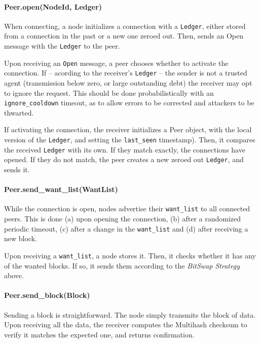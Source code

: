 \documentclass{sig-alternate}
\begin{document}
\paragraph{Peer.open(NodeId, Ledger)}

When connecting, a node initializes a connection with a
\texttt{Ledger}, either stored from a connection in the past or a new one
zeroed out. Then, sends an Open message with the \texttt{Ledger} to the peer.

Upon receiving an \texttt{Open} message, a peer chooses whether to activate
the connection. If -- acording to the receiver's \texttt{Ledger} -- the sender
is not a trusted agent (transmission below zero, or large outstanding debt) the
receiver may opt to ignore the request. This should be done probabilistically
with an \texttt{ignore\_cooldown} timeout, as to allow errors to be corrected
and attackers to be thwarted.

If activating the connection, the receiver initializes a Peer object, with the
local version of the \texttt{Ledger}, and setting the \texttt{last\_seen}
timestamp). Then, it compares the received
\texttt{Ledger} with its own. If they match exactly, the connections have
opened. If they do not match, the peer creates a new zeroed out
\texttt{Ledger}, and sends it.


\paragraph{Peer.send\_want\_list(WantList)}

While the connection is open, nodes advertise their
\texttt{want\_list} to all connected peers. This is done (a) upon opening the
connection, (b) after a randomized periodic timeout, (c) after a change in
the \texttt{want\_list} and (d) after receiving a new block.

Upon receiving a \texttt{want\_list}, a node stores it. Then, it checks whether
it has any of the wanted blocks. If so, it sends them according to the
\textit{BitSwap Strategy} above.

\paragraph{Peer.send\_block(Block)}

Sending a block is straightforward. The node simply transmits the block of
data. Upon receiving all the data, the receiver computes the Multihash
checksum to verify it matches the expected one, and returns confirmation.
\end{document}
